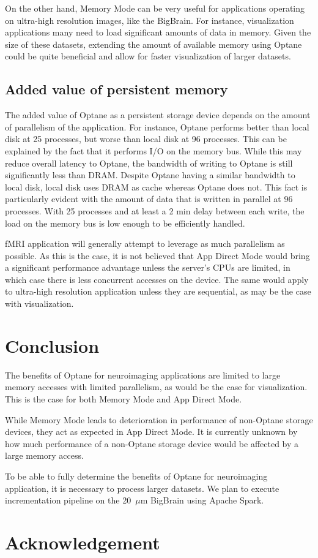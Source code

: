 \documentclass[conference]{IEEEtran}
\newcommand{\bigbrain}{BigBrain\xspace}
\begin{document}
On the other hand, Memory Mode can be very useful for applications operating on
ultra-high resolution images, like the \bigbrain. For instance, visualization applications
many need to load significant amounts of data in memory. Given the size of these datasets, 
extending the amount of available memory using Optane could be quite beneficial and allow
for faster visualization of larger datasets.


\subsection{Added value of persistent memory}

The added value of Optane as a persistent storage device depends on the amount of parallelism
of the application. For instance, Optane performs better than local disk at 25 processes,
but worse than local disk at 96 processes. This can be explained by the fact that it performs
I/O on the memory bus. While this may reduce overall latency to Optane, the bandwidth of 
writing to Optane is still significantly less than DRAM. Despite Optane having a similar bandwidth
to local disk, local disk uses DRAM as cache whereas Optane does not. This fact is 
particularly evident with the amount of data that is written in parallel at 96 processes. With 25 processes
and at least a 2 min
delay between each write, the load on the memory bus is low enough to be efficiently handled.

fMRI application will generally attempt to leverage as much parallelism as possible. As this
is the case, it is not believed that App Direct Mode would bring a significant performance advantage
unless the server's CPUs are limited, in which case there is less concurrent accesses on the device.
The same would apply to ultra-high resolution application unless they are sequential, as may be the case with
visualization.
\section{Conclusion}

The benefits of Optane for neuroimaging applications are limited to large memory
accesses with limited parallelism, as would be the case for visualization. This is
the case for both Memory Mode and App Direct Mode.

While Memory Mode leads to deterioration in performance of non-Optane storage devices,
they act as expected in App Direct Mode. It is currently unknown by how much performance
of a non-Optane storage device would be affected by a large memory access.

To be able to fully determine the benefits of Optane for neuroimaging application,
it is necessary to process larger datasets. We plan to execute incrementation pipeline on the 
20~$\mu$m BigBrain using Apache Spark. 
\section{Acknowledgement}
 

\end{document}

